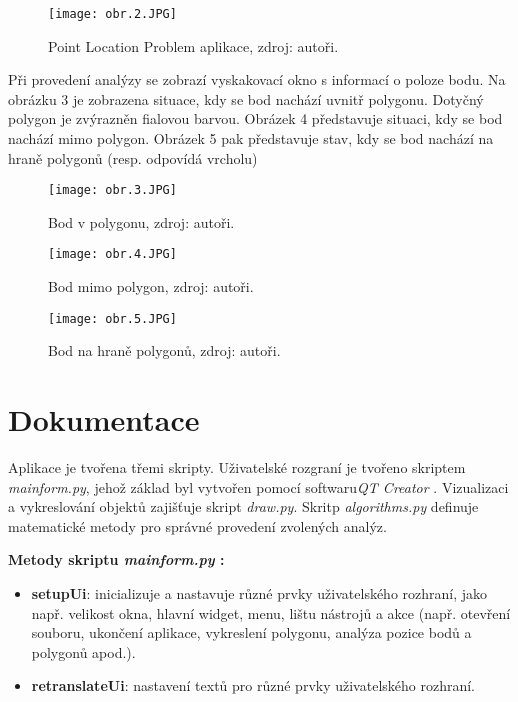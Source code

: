 \documentclass[a4paper,12pt]{article}
\begin{document}
    
    \begin{figure}[h]
    \texttt{[image: obr.2.JPG]}
    \centering
    \caption{Point Location Problem aplikace, zdroj: autoři.}
    \label{fig:obr2}
    \end{figure}
    
     Při provedení analýzy se zobrazí vyskakovací okno s informací o poloze bodu. Na obrázku 3 je zobrazena situace, kdy se bod nachází uvnitř polygonu. Dotyčný polygon je zvýrazněn fialovou barvou. Obrázek 4 představuje situaci, kdy se bod nachází mimo polygon. Obrázek 5 pak představuje stav, kdy se bod nachází na hraně polygonů (resp. odpovídá vrcholu)
    \begin{figure}[htbp]
    \texttt{[image: obr.3.JPG]}
    \centering
    \caption{Bod v polygonu, zdroj: autoři.}
    \label{fig:obr3}
    \end{figure}
    
    \begin{figure}[htbp]
    \texttt{[image: obr.4.JPG]}
    \centering
    \caption{Bod mimo polygon, zdroj: autoři.}
    \label{fig:obr4}
    \end{figure}

    \begin{figure}[htbp]
    \texttt{[image: obr.5.JPG]}
    \centering
    \caption{Bod na hraně polygonů, zdroj: autoři.}
    \label{fig:obr5}
    \end{figure}

    \newpage
    \newpage
    \section{Dokumentace}
    Aplikace je tvořena třemi skripty. Uživatelské rozgraní je tvořeno skriptem \emph{mainform.py}, jehož základ byl vytvořen pomocí softwaru\emph{QT Creator} . Vizualizaci a vykreslování objektů zajišťuje skript \emph{draw.py}. Skritp \emph{algorithms.py} definuje matematické metody pro správné provedení zvolených analýz.

    \textbf{Metody skriptu \emph{mainform.py} :}
    
    \begin{itemize}
        \item \textbf{setupUi}: inicializuje a nastavuje různé prvky uživatelského rozhraní, jako např. velikost okna, hlavní widget, menu, lištu nástrojů a akce (např. otevření souboru, ukončení aplikace, vykreslení polygonu, analýza pozice bodů a polygonů apod.).
        
        \item \textbf{retranslateUi}: nastavení textů pro různé prvky uživatelského rozhraní.
        
    \end{itemize}
\end{document}
